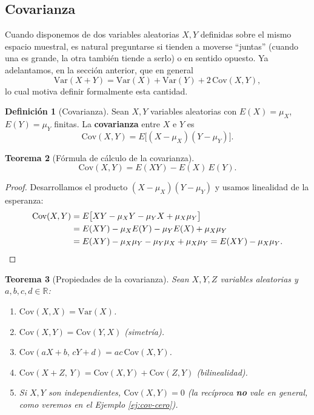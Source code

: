 \documentclass[11pt,a4paper]{article}
\theoremstyle{plain}
\newtheorem{teorema}{Teorema}[section]
\theoremstyle{definition}
\newtheorem{definicion}[teorema]{Definición}
\theoremstyle{remark}
\begin{document}
\subsection{Covarianza}

Cuando disponemos de dos variables aleatorias $X,Y$ definidas sobre el mismo espacio muestral, es natural preguntarse si tienden a moverse ``juntas'' (cuando una es grande, la otra también tiende a serlo) o en sentido opuesto. Ya adelantamos, en la sección anterior, que en general
\[
\text{Var}(X+Y) = \text{Var}(X)+\text{Var}(Y)+2\,\text{Cov}(X,Y),
\]
lo cual motiva definir formalmente esta cantidad.

\begin{definicion}[Covarianza]
Sean $X,Y$ variables aleatorias con $E(X)=\mu_X$, $E(Y)=\mu_Y$ finitas. La \textbf{covarianza} entre $X$ e $Y$ es
\[
\text{Cov}(X,Y) = E\big[(X-\mu_X)(Y-\mu_Y)\big].
\]
\end{definicion}

\begin{teorema}[Fórmula de cálculo de la covarianza]
\[
\text{Cov}(X,Y) = E(XY) - E(X)\,E(Y).
\]
\end{teorema}

\begin{proof}
Desarrollamos el producto $(X-\mu_X)(Y-\mu_Y)$ y usamos linealidad de la esperanza:
\begin{align*}
\text{Cov}(X,Y) &= E\big[XY - \mu_X Y - \mu_Y X + \mu_X \mu_Y\big] \\
&= E(XY) - \mu_X E(Y) - \mu_Y E(X) + \mu_X\mu_Y \\
&= E(XY) - \mu_X\mu_Y - \mu_Y\mu_X + \mu_X\mu_Y = E(XY) - \mu_X\mu_Y. \qedhere
\end{align*}
\end{proof}

\begin{teorema}[Propiedades de la covarianza]
Sean $X,Y,Z$ variables aleatorias y $a,b,c,d\in\mathbb{R}$:
\begin{enumerate}[label=(\roman*)]
\item $\text{Cov}(X,X)=\text{Var}(X)$.
\item $\text{Cov}(X,Y)=\text{Cov}(Y,X)$ (simetría).
\item $\text{Cov}(aX+b,\,cY+d) = ac\,\text{Cov}(X,Y)$.
\item $\text{Cov}(X+Z,\,Y) = \text{Cov}(X,Y)+\text{Cov}(Z,Y)$ (bilinealidad).
\item Si $X,Y$ son independientes, $\text{Cov}(X,Y)=0$ (la recíproca \textbf{no} vale en general, como veremos en el Ejemplo \ref{ej:cov-cero}).
\end{enumerate}
\end{teorema}
\end{document}
